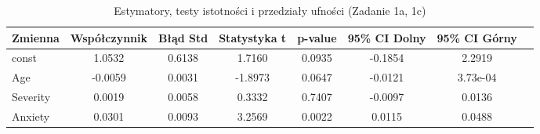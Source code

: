 \begin{table}[H]
\caption{Estymatory, testy istotności i przedziały ufności (Zadanie 1a, 1c)}
\label{tab:zad1_coeffs}
\begin{tabular}{lccccccc}
\toprule
Zmienna & Współczynnik & Błąd Std & Statystyka t & p-value & 95\% CI Dolny & 95\% CI Górny \\
\midrule
const & 1.0532 & 0.6138 & 1.7160 & 0.0935 & -0.1854 & 2.2919 \\
Age & -0.0059 & 0.0031 & -1.8973 & 0.0647 & -0.0121 & 3.73e-04 \\
Severity & 0.0019 & 0.0058 & 0.3332 & 0.7407 & -0.0097 & 0.0136 \\
Anxiety & 0.0301 & 0.0093 & 3.2569 & 0.0022 & 0.0115 & 0.0488 \\
\bottomrule
\end{tabular}
\end{table}
